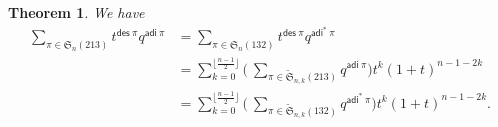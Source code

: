 \documentclass[12pt,reqno]{amsart}
\numberwithin{equation}{section}
\theoremstyle{plain}
\newtheorem{theorem}{Theorem}[section]
\theoremstyle{definition}
\def\S{\mathfrak{S}}
\def\ai{\mathsf{adi}}
\def\des{\mathsf{des}}
\begin{document}
\begin{theorem}\label{thm:des-ai-qgamma-new} We have
\begin{align}
\label{213--132}
\sum_{\pi\in \S_{n}(213)}t^{\des\:\pi}q^{\ai\:\pi}&=
\sum_{\pi\in \S_{n}(132)}t^{\des\:\pi}q^{\ai^*\:\pi}\\
\label{213--ai}
&=\sum_{k=0}^{\lfloor \frac{n-1}{2}\rfloor}\biggl(\:\sum_{\pi\in\widetilde{\S}_{n,k}(213)}q^{\ai\:\pi}\biggr)t^k(1+t)^{n-1-2k}\\
\label{132--ai}
&=\sum_{k=0}^{\lfloor \frac{n-1}{2}\rfloor}\biggl(\:\sum_{\pi\in\widetilde{\S}_{n,k}(132)}q^{\ai^*\:\pi}\biggr)t^k(1+t)^{n-1-2k}.
\end{align}
\end{theorem}
\end{document}
